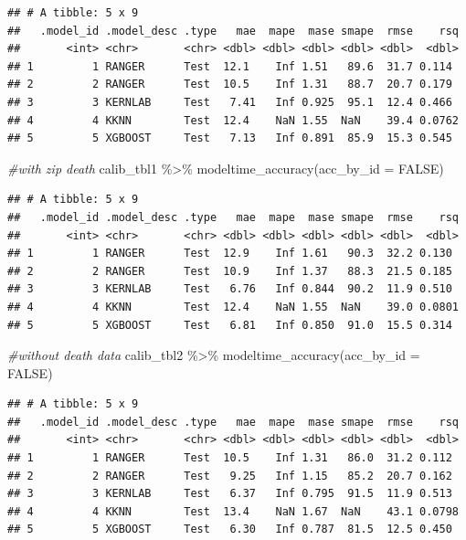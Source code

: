 \documentclass[
]{article}
\newenvironment{Shaded}{\begin{snugshade}}{\end{snugshade}}
\newcommand{\AttributeTok}[1]{\textcolor[rgb]{0.77,0.63,0.00}{#1}}
\newcommand{\CommentTok}[1]{\textcolor[rgb]{0.56,0.35,0.01}{\textit{#1}}}
\newcommand{\ConstantTok}[1]{\textcolor[rgb]{0.00,0.00,0.00}{#1}}
\newcommand{\FunctionTok}[1]{\textcolor[rgb]{0.00,0.00,0.00}{#1}}
\newcommand{\NormalTok}[1]{#1}
\newcommand{\SpecialCharTok}[1]{\textcolor[rgb]{0.00,0.00,0.00}{#1}}
\begin{document}
\begin{verbatim}
## # A tibble: 5 x 9
##   .model_id .model_desc .type   mae  mape  mase smape  rmse    rsq
##       <int> <chr>       <chr> <dbl> <dbl> <dbl> <dbl> <dbl>  <dbl>
## 1         1 RANGER      Test  12.1    Inf 1.51   89.6  31.7 0.114 
## 2         2 RANGER      Test  10.5    Inf 1.31   88.7  20.7 0.179 
## 3         3 KERNLAB     Test   7.41   Inf 0.925  95.1  12.4 0.466 
## 4         4 KKNN        Test  12.4    NaN 1.55  NaN    39.4 0.0762
## 5         5 XGBOOST     Test   7.13   Inf 0.891  85.9  15.3 0.545
\end{verbatim}

\begin{Shaded}
\begin{Highlighting}[]
\CommentTok{\#with zip death}
\NormalTok{calib\_tbl1 }\SpecialCharTok{\%\textgreater{}\%} 
    \FunctionTok{modeltime\_accuracy}\NormalTok{(}\AttributeTok{acc\_by\_id =} \ConstantTok{FALSE}\NormalTok{)}
\end{Highlighting}
\end{Shaded}

\begin{verbatim}
## # A tibble: 5 x 9
##   .model_id .model_desc .type   mae  mape  mase smape  rmse    rsq
##       <int> <chr>       <chr> <dbl> <dbl> <dbl> <dbl> <dbl>  <dbl>
## 1         1 RANGER      Test  12.9    Inf 1.61   90.3  32.2 0.130 
## 2         2 RANGER      Test  10.9    Inf 1.37   88.3  21.5 0.185 
## 3         3 KERNLAB     Test   6.76   Inf 0.844  90.2  11.9 0.510 
## 4         4 KKNN        Test  12.4    NaN 1.55  NaN    39.0 0.0801
## 5         5 XGBOOST     Test   6.81   Inf 0.850  91.0  15.5 0.314
\end{verbatim}

\begin{Shaded}
\begin{Highlighting}[]
\CommentTok{\#without death data}
\NormalTok{calib\_tbl2 }\SpecialCharTok{\%\textgreater{}\%} 
    \FunctionTok{modeltime\_accuracy}\NormalTok{(}\AttributeTok{acc\_by\_id =} \ConstantTok{FALSE}\NormalTok{)}
\end{Highlighting}
\end{Shaded}

\begin{verbatim}
## # A tibble: 5 x 9
##   .model_id .model_desc .type   mae  mape  mase smape  rmse    rsq
##       <int> <chr>       <chr> <dbl> <dbl> <dbl> <dbl> <dbl>  <dbl>
## 1         1 RANGER      Test  10.5    Inf 1.31   86.0  31.2 0.112 
## 2         2 RANGER      Test   9.25   Inf 1.15   85.2  20.7 0.162 
## 3         3 KERNLAB     Test   6.37   Inf 0.795  91.5  11.9 0.513 
## 4         4 KKNN        Test  13.4    NaN 1.67  NaN    43.1 0.0798
## 5         5 XGBOOST     Test   6.30   Inf 0.787  81.5  12.5 0.450
\end{verbatim}
\end{document}
